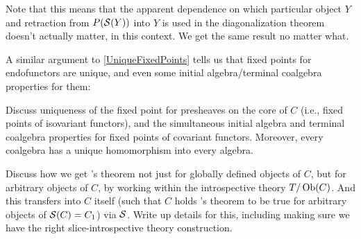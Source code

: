 \begin{observation}
Note that this means that the apparent dependence on which particular object $Y$ and retraction from $P(\mathcal{S}(Y))$ into $Y$ is used in the diagonalization theorem doesn't actually matter, in this context. We get the same result no matter what. 
\end{observation}

A similar argument to \cref{UniqueFixedPoints} tells us that fixed points for endofunctors are unique, and even some initial algebra/terminal coalgebra properties for them: \TODO

\begin{TODOblock}
Discuss uniqueness of the fixed point for presheaves on the core of $C$ (i.e., fixed points of isovariant functors), and the simultaneous initial algebra and terminal coalgebra properties for fixed points of covariant functors. Moreover, every coalgebra has a unique homomorphism into every algebra.
\end{TODOblock}

\begin{TODOblock}
Discuss how we get \Loeb's theorem not just for globally defined objects of $C$, but for arbitrary objects of $C$, by working within the introspective theory $T/\operatorname{Ob}(C)$. And this transfers into $C$ itself (such that $C$ holds \Loeb's theorem to be true for arbitrary objects of $\mathcal{S}(C) = C_1$) via $\mathcal{S}$. Write up details for this, including making sure we have the right slice-introspective theory construction.
\end{TODOblock}